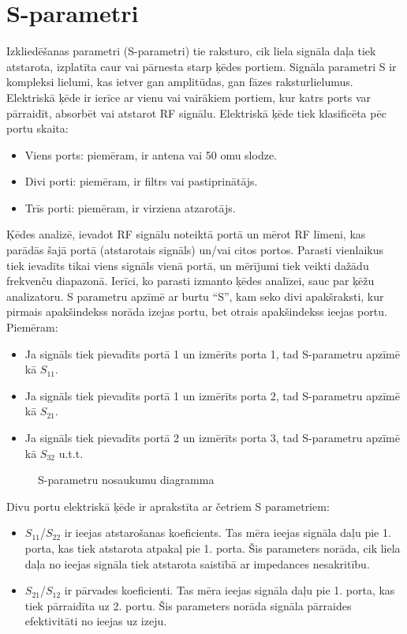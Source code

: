 \section{S-parametri}
Izkliedēšanas parametri \cite{s_param} (S-parametri) tie raksturo, cik liela signāla daļa tiek atstarota, izplatīta caur vai pārnesta starp ķēdes portiem. Signāla parametri S ir kompleksi lielumi, kas ietver gan amplitūdas, gan fāzes raksturlielumus. Elektriskā ķēde ir ierīce ar vienu vai vairākiem portiem, kur katrs ports var pārraidīt, absorbēt vai atstarot RF signālu. 
Elektriskā ķēde tiek klasificēta pēc portu skaita: 
\begin{itemize}
    \item Viens ports: piemēram, ir antena vai 50 omu slodze.
    \item Divi porti: piemēram, ir filtrs vai pastiprinātājs.
    \item Trīs porti: piemēram, ir virziena atzarotājs.
\end{itemize}
Ķēdes analizē, ievadot RF signālu noteiktā portā un mērot RF līmeni, kas parādās šajā portā (atstarotais signāls) un/vai citos portos. Parasti vienlaikus tiek ievadīts tikai viens signāls vienā portā, un mērījumi tiek veikti dažādu frekvenču diapazonā. Ierīci, ko parasti izmanto ķēdes analīzei, sauc par ķēžu analizatoru.
S parametru apzīmē ar burtu “S”, kam seko divi apakšraksti, kur pirmais apakšindekss norāda izejas portu, bet otrais apakšindekss ieejas portu. Piemēram:
\begin{itemize}
    \item Ja signāls tiek pievadīts portā 1 un izmērīts porta 1, tad S-parametru apzīmē kā $S_{11}$.
    \item Ja signāls tiek pievadīts portā 1 un izmērīts porta 2, tad S-parametru apzīmē kā $S_{21}$.
    \item Ja signāls tiek pievadīts portā 2 un izmērīts porta 3, tad S-parametru apzīmē kā $S_{32}$ u.t.t.
\end{itemize}
\begin{figure}[H]
	\centering
    
    \hspace{1cm}
    \caption{S-parametru nosaukumu diagramma}
\end{figure}
Divu portu elektriskā ķēde ir aprakstīta ar četriem S parametriem:
\begin{itemize}
    \item $S_{11}$/$S_{22}$ ir ieejas atstarošanas koeficients. Tas mēra ieejas signāla daļu pie 1. porta, kas tiek atstarota atpakaļ pie 1. porta. Šis parameters norāda, cik liela daļa no ieejas signāla tiek atstarota saistībā ar impedances nesakritību.
    \item $S_{21}$/$S_{12}$ ir pārvades koeficienti. Tas mēra ieejas signāla daļu pie 1. porta, kas tiek pārraidīta uz 2. portu. Šis parameters norāda signāla pārraides efektivitāti no ieejas uz izeju.
\end{itemize}

